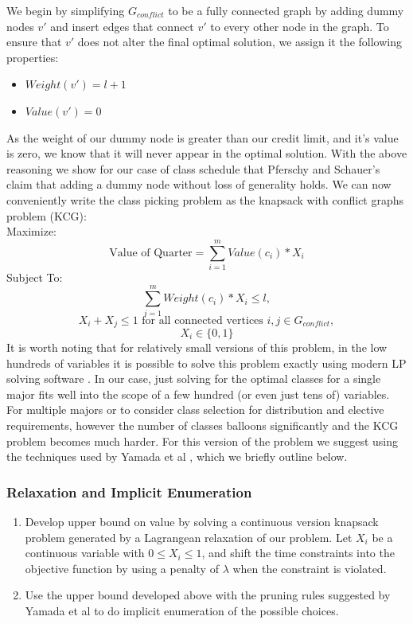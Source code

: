 \documentclass[11pt]{article} %
\begin{document}
We begin by simplifying $G_{conflict}$ to be a fully connected graph by adding dummy nodes $v'$ and insert edges that connect $v'$ to every other node in the graph. To ensure that $v'$ does not alter the final optimal solution, we assign it the following properties:
\begin{itemize}
\item $Weight(v') = l+1$
\item $Value(v') = 0$
\end{itemize}
As the weight of our dummy node is greater than our credit limit, and it's value is zero, we know that it will never appear in the optimal solution. With the above reasoning we show for our case of class schedule that Pferschy and Schauer's \cite{pferschy:kcg} claim that adding a dummy node without loss of generality holds. We can now conveniently write the class picking problem as the knapsack with conflict graphs problem (KCG): \\
Maximize:
$$
\text{Value of Quarter} = \sum_{i=1}^m Value(c_i) * X_i
$$
Subject To:
$$
\sum_{i=1}^m Weight(c_i) * X_i \leq l,
$$
$$
X_i + X_j \leq 1 \text{ for all connected vertices } i, j \in G_{conflict},
$$
$$
X_i \in \{0, 1\}
$$
It is worth noting that for relatively small versions of this problem, in the low hundreds of variables it is possible to solve this problem exactly using modern LP solving software \cite{yamada:heuristic}. In our case, just solving for the optimal classes for a single major fits well into the scope of a few hundred (or even just tens of) variables. For multiple majors or to consider class selection for distribution and elective requirements, however the number of classes balloons significantly and the KCG problem becomes much harder. For this version of the problem we suggest using the techniques used by Yamada et al \cite{yamada:heuristic}, which we briefly outline below.

\subsubsection{Relaxation and Implicit Enumeration}
\begin{enumerate}
\item Develop upper bound on value by solving a continuous version knapsack problem generated by a Lagrangean relaxation of our problem. Let $X_i$ be a continuous variable with $0 \leq X_i \leq 1$, and shift the time constraints into the objective function by using a penalty of $\lambda$ when the constraint is violated.
\item Use the upper bound developed above with the pruning rules suggested by Yamada et al \cite{yamada:heuristic} to do implicit enumeration of the possible choices.
\end{enumerate}
\end{document}
